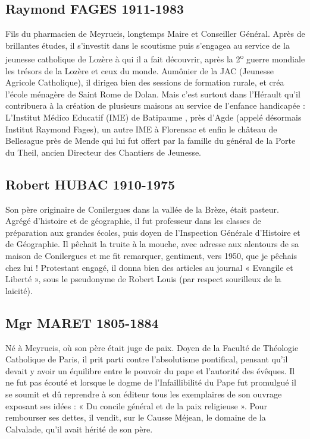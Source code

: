 \subsection*{Raymond FAGES 1911-1983}

Fils du pharmacien de Meyrueis, longtemps Maire et Conseiller Général. Après de
brillantes études, il s’investit dans le scoutisme puis s’engagea au service de la
jeunesse catholique de Lozère à qui il a fait découvrir, après la 2\textsuperscript{o} guerre mondiale
les trésors de la Lozère et ceux du monde.
Aumônier de la JAC (Jeunesse Agricole Catholique), il dirigea bien des sessions de
formation rurale, et créa l’école ménagère de Saint Rome de Dolan. Mais c’est
surtout dans l’Hérault qu’il contribuera à la création de plusieurs maisons au service
de l’enfance handicapée :
L’Institut Médico Educatif (IME) de Batipaume , près d’Agde (appelé désormais
Institut Raymond Fages), un autre IME à Florensac et enfin le château de Bellesague
près de Mende qui lui fut offert par la famille du général de la Porte du Theil, ancien
Directeur des Chantiers de Jeunesse.

\subsection*{Robert HUBAC 1910-1975}

Son père originaire de Conilergues dans la vallée de la Brèze, était pasteur. Agrégé
d’histoire et de géographie, il fut professeur dans les classes de préparation aux
grandes écoles, puis doyen de l’Inspection Générale d’Histoire et de Géographie.
Il pêchait la truite à la mouche, avec adresse aux alentours de sa maison de
Conilergues et me fit remarquer, gentiment, vers 1950, que je pêchais chez lui !
Protestant engagé, il donna bien des articles au journal « Evangile et Liberté », sous
le pseudonyme de Robert Louis (par respect sourilleux de la laïcité).

\subsection*{Mgr MARET 1805-1884}

Né à Meyrueis, où son père était juge de paix. Doyen de la Faculté de Théologie
Catholique de Paris, il prit parti contre l’absolutisme pontifical, pensant qu’il devait
y avoir un équilibre entre le pouvoir du pape et l’autorité des évêques.
Il ne fut pas écouté et lorsque le dogme de l’Infaillibilité du Pape fut promulgué il se
soumit et dû reprendre à son éditeur tous les exemplaires de son ouvrage exposant
ses idées : « Du concile général et de la paix religieuse ». Pour rembourser ses
dettes, il vendit, sur le Causse Méjean, le domaine de la Calvalade, qu’il avait hérité
de son père.


